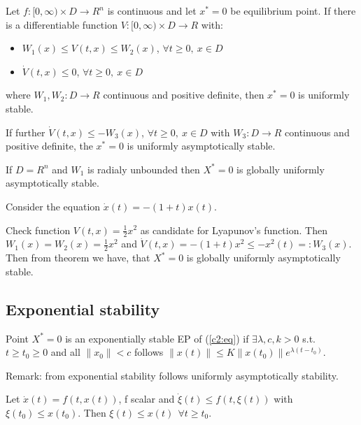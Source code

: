 \begin{Theorem}
 Let $f:[0,\infty)\times D\to R^n$ is continuous and let $x^*=0$ be equilibrium point.
 If there is a differentiable function $V:[0,\infty)\times D\to R$ with:
 \begin{itemize}
  \item $W_1(x) \le V(t,x) \le W_2(x)$, $\forall t\ge0,\ x\in D$
  \item $\dot V(t,x)\le 0$, $\forall t \ge0,\ x\in D$
 \end{itemize}
 where $W_1,W_2:D \to R$ continuous and positive definite, then $x^*=0$ is uniformly stable.

 If further $\dot V(t,x) \le -W_3(x)$, $\forall t\ge0,\ x\in D$ with $W_3:D \to R$
 continuous and positive definite, the $x^*=0$ is uniformly asymptotically stable.

 If $D=R^n$ and $W_1$ is radialy unbounded then $X^*=0$ is globally uniformly
 asymptotically stable.
\end{Theorem}

\begin{Example}
 Consider the equation $\dot x(t) = -(1+t)x(t)$.

 Check function $V(t,x)=\frac{1}{2}x^2$ as candidate for Lyapunov's function. Then
 $W_1(x)=W_2(x)=\frac{1}{2}x^2$ and $\dot V(t,x)=-(1+t)x^2 \le -x^2(t)=: W_3(x)$.
 Then from theorem we have, that $X^*=0$  is globally uniformly asymptotically stable.
\end{Example}


\subsection{Exponential stability}

\begin{Definition}
 Point $X^*=0$ is an exponentially stable EP of (\ref{c2:eq}) if $\exists \lambda,c,k>0$
 s.t. $t \ge t_0 \ge 0$ and all $\|x_0\|<c$ follows
 $\|x(t)\|\le K\|x(t_0)\|e^{\lambda(t-t_0)}$.
\end{Definition}

Remark: from exponential stability follows uniformly asymptotically stability.

\begin{Lemma}
 Let $\dot x(t)=f(t,x(t))$, f scalar and $\dot \xi(t)\le f(t, \xi(t))$ with 
 $\xi (t_0)\le x(t_0)$. Then $\xi (t) \le x(t)\ \ \forall t\ge t_0$.
\end{Lemma}

